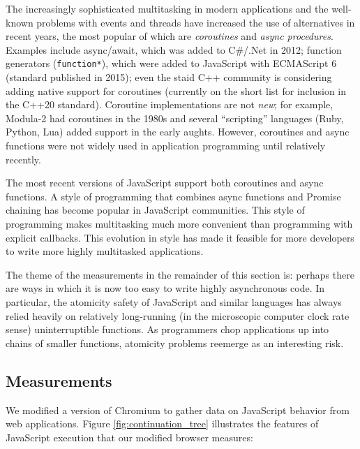 \documentclass[acmsmall,anonymous,review]{acmart}\settopmatter{printfolios=true,printccs=false,printacmref=false}
\begin{document}
The increasingly sophisticated multitasking in modern applications and the well-known problems with events and threads have increased the use of alternatives in recent years, the most popular of which are \emph{coroutines} and \emph{async procedures}.
Examples include async/await, which was added to C\#/.Net in 2012; function generators (\texttt{function*}), which were added to JavaScript with ECMAScript 6 (standard published in 2015); even the staid C++ community is considering adding native support for coroutines (currently on the short list for inclusion in the C++20 standard).
Coroutine implementations are not \emph{new}; for example, Modula-2 had coroutines in the 1980s and several ``scripting'' languages (Ruby, Python, Lua) added support in the early aughts.
However, coroutines and async functions were not widely used in application programming until relatively recently.

The most recent versions of JavaScript support both coroutines and async functions.
A style of programming that combines async functions and Promise chaining has become popular in JavaScript communities.
This style of programming makes multitasking much more convenient than programming with explicit callbacks.
This evolution in style has made it feasible for more developers to write more highly multitasked applications.

The theme of the measurements in the remainder of this section is: perhaps there are ways in which it is now too easy to write highly asynchronous code.
In particular, the atomicity safety of JavaScript and similar languages has always relied heavily on relatively long-running (in the microscopic computer clock rate sense) uninterruptible functions.
As programmers chop applications up into chains of smaller functions, atomicity problems reemerge as an interesting risk.

\subsection{Measurements}

We modified a version of Chromium to gather data on JavaScript behavior from web applications.
Figure \ref{fig:continuation_tree} illustrates the features of JavaScript execution that our modified browser measures:
\end{document}
